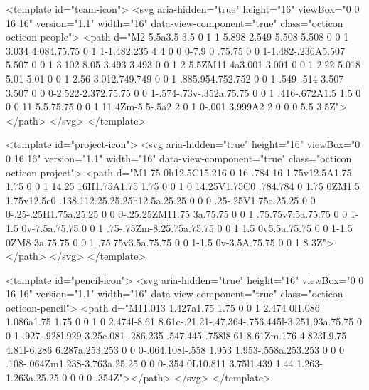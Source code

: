 <template id="team-icon">
  <svg aria-hidden="true" height="16" viewBox="0 0 16 16" version="1.1" width="16" data-view-component="true" class="octicon octicon-people">
    <path d="M2 5.5a3.5 3.5 0 1 1 5.898 2.549 5.508 5.508 0 0 1 3.034 4.084.75.75 0 1 1-1.482.235 4 4 0 0 0-7.9 0 .75.75 0 0 1-1.482-.236A5.507 5.507 0 0 1 3.102 8.05 3.493 3.493 0 0 1 2 5.5ZM11 4a3.001 3.001 0 0 1 2.22 5.018 5.01 5.01 0 0 1 2.56 3.012.749.749 0 0 1-.885.954.752.752 0 0 1-.549-.514 3.507 3.507 0 0 0-2.522-2.372.75.75 0 0 1-.574-.73v-.352a.75.75 0 0 1 .416-.672A1.5 1.5 0 0 0 11 5.5.75.75 0 0 1 11 4Zm-5.5-.5a2 2 0 1 0-.001 3.999A2 2 0 0 0 5.5 3.5Z"></path>
</svg>
</template>

<template id="project-icon">
  <svg aria-hidden="true" height="16" viewBox="0 0 16 16" version="1.1" width="16" data-view-component="true" class="octicon octicon-project">
    <path d="M1.75 0h12.5C15.216 0 16 .784 16 1.75v12.5A1.75 1.75 0 0 1 14.25 16H1.75A1.75 1.75 0 0 1 0 14.25V1.75C0 .784.784 0 1.75 0ZM1.5 1.75v12.5c0 .138.112.25.25.25h12.5a.25.25 0 0 0 .25-.25V1.75a.25.25 0 0 0-.25-.25H1.75a.25.25 0 0 0-.25.25ZM11.75 3a.75.75 0 0 1 .75.75v7.5a.75.75 0 0 1-1.5 0v-7.5a.75.75 0 0 1 .75-.75Zm-8.25.75a.75.75 0 0 1 1.5 0v5.5a.75.75 0 0 1-1.5 0ZM8 3a.75.75 0 0 1 .75.75v3.5a.75.75 0 0 1-1.5 0v-3.5A.75.75 0 0 1 8 3Z"></path>
</svg>
</template>

<template id="pencil-icon">
  <svg aria-hidden="true" height="16" viewBox="0 0 16 16" version="1.1" width="16" data-view-component="true" class="octicon octicon-pencil">
    <path d="M11.013 1.427a1.75 1.75 0 0 1 2.474 0l1.086 1.086a1.75 1.75 0 0 1 0 2.474l-8.61 8.61c-.21.21-.47.364-.756.445l-3.251.93a.75.75 0 0 1-.927-.928l.929-3.25c.081-.286.235-.547.445-.758l8.61-8.61Zm.176 4.823L9.75 4.81l-6.286 6.287a.253.253 0 0 0-.064.108l-.558 1.953 1.953-.558a.253.253 0 0 0 .108-.064Zm1.238-3.763a.25.25 0 0 0-.354 0L10.811 3.75l1.439 1.44 1.263-1.263a.25.25 0 0 0 0-.354Z"></path>
</svg>
</template>

